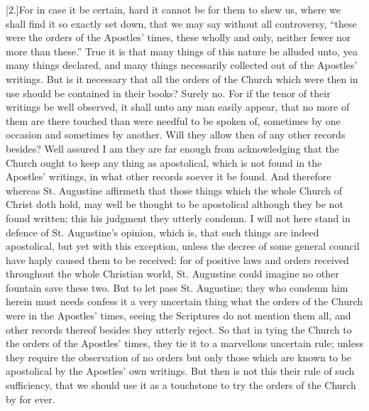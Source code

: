 [2.]For in case it be certain, hard it cannot be for them to shew us, where we shall find it so exactly set down, that we may say without all controversy, “these were the orders of the Apostles’ times, these wholly and only, neither fewer nor more than these.” True it is that many things of this nature be alluded unto, yea many things declared, and many things necessarily collected out of the Apostles’ writings. But is it necessary that all the orders of the Church which were then in use should be contained in their books? Surely no. For if the tenor of their writings be well observed, it shall unto any man easily appear, that no more of them are there touched than were needful to be spoken of, sometimes  by one occasion and sometimes by another. Will they allow then of any other records besides? Well assured I am they are far enough from acknowledging that the Church ought to keep any thing as apostolical, which is not found in the Apostles’ writings, in what other records soever it be found. And therefore whereas St. Augustine affirmeth that those things which the whole Church of Christ doth hold, may well be thought to be apostolical although they be not found written; this his judgment they utterly condemn. I will not here stand in defence of St. Augustine’s opinion, which is, that such things are indeed apostolical, but yet with this exception, unless the decree of some general council have haply caused them to be received: for of positive laws and orders received throughout the whole Christian world, St. Augustine could imagine no other fountain save these two. But to let pass St. Augustine; they who condemn him herein must needs confess it a very uncertain thing what the orders of the Church were in the Apostles’ times, seeing the Scriptures do not mention them all, and other records thereof besides they utterly reject. So that in tying the Church to the orders of the Apostles’ times, they tie it to a marvellous uncertain rule; unless they require the observation of no orders but only those which are known to be apostolical by the Apostles’ own writings. But then is not this their rule of such sufficiency, that we should use it as a touchstone to try the orders of the Church by for ever.

